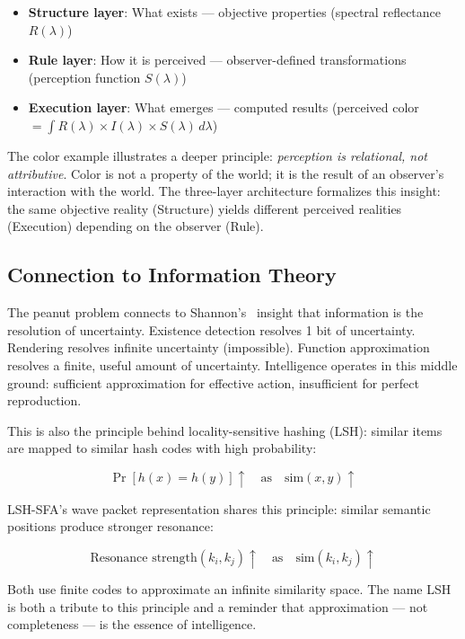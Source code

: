 \documentclass{article}
\begin{document}
\begin{itemize}
\item \textbf{Structure layer}: What exists --- objective properties (spectral reflectance $R(\lambda)$)
\item \textbf{Rule layer}: How it is perceived --- observer-defined transformations (perception function $S(\lambda)$)
\item \textbf{Execution layer}: What emerges --- computed results (perceived color $= \int R(\lambda) \times I(\lambda) \times S(\lambda) \, d\lambda$)
\end{itemize}

The color example illustrates a deeper principle: \textit{perception is relational, not attributive}. Color is not a property of the world; it is the result of an observer's interaction with the world. The three-layer architecture formalizes this insight: the same objective reality (Structure) yields different perceived realities (Execution) depending on the observer (Rule).

\subsection{Connection to Information Theory}

The peanut problem connects to Shannon's~\citep{shannon1948} insight that information is the resolution of uncertainty. Existence detection resolves 1 bit of uncertainty. Rendering resolves infinite uncertainty (impossible). Function approximation resolves a finite, useful amount of uncertainty. Intelligence operates in this middle ground: sufficient approximation for effective action, insufficient for perfect reproduction.

This is also the principle behind locality-sensitive hashing (LSH): similar items are mapped to similar hash codes with high probability:

\begin{equation}
\Pr[h(x) = h(y)] \uparrow \quad \text{as} \quad \text{sim}(x, y) \uparrow
\end{equation}

LSH-SFA's wave packet representation shares this principle: similar semantic positions produce stronger resonance:

\begin{equation}
\text{Resonance strength}(k_i, k_j) \uparrow \quad \text{as} \quad \text{sim}(k_i, k_j) \uparrow
\end{equation}

Both use finite codes to approximate an infinite similarity space. The name LSH is both a tribute to this principle and a reminder that approximation --- not completeness --- is the essence of intelligence.
\end{document}
